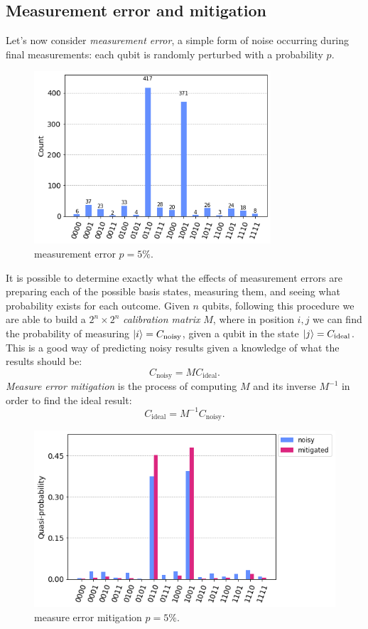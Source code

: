 \documentclass{article}
\begin{document}
\subsection{Measurement error and mitigation}
Let's now consider \emph{measurement error}, a simple form of noise occurring
during final measurements: each qubit is randomly perturbed with a probability
$p$.
\begin{figure}[H]
  \centering
  \includegraphics[width=250pt]{Img/error-m.png}
  \caption{measurement error $p = 5\%$.}
\end{figure}
It is possible to determine exactly what the effects of measurement errors
are preparing each of the possible basis states, measuring them, and
seeing what probability exists for each outcome.
Given $n$ qubits, following this procedure we are able to build a $2^n \times
2^n$ \emph{calibration matrix} $M$, where in position $i, j$ we can find the
probability of
measuring $\ket{i} = C_\text{noisy}$, given a qubit in the state
$\ket{j} = C_\text{ideal}$.
This is a good way of predicting noisy results given a knowledge of what the
results should be:
\[
C_\text{noisy} = M C_\text{ideal}.
\]
\emph{Measure error mitigation} is the process of computing $M$ and its
inverse $M^{-1}$ in order to find the ideal result:
\[
C_\text{ideal} = M^{-1} C_\text{noisy}.
\]
\begin{figure}[H]
  \centering
  \includegraphics[width=335pt]{Img/error-m-mitigation.png}
  \caption{measure error mitigation $p = 5\%$.}
\end{figure}
\end{document}

